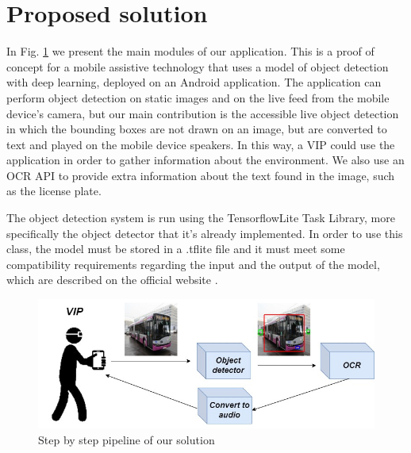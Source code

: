\section{Proposed solution} \label{deployment}

    In Fig. \ref{pipeline} we present the main modules of our application. This is a proof of concept for a mobile assistive technology that uses a model of object detection with deep learning, deployed on an Android application. The application can perform object detection on static images and on the live feed from the mobile device's camera, but our main contribution is the accessible live object detection in which the bounding boxes are not drawn on an image, but are converted to text and played on the mobile device speakers. In this way, a VIP could use the application in order to gather information about the environment. We also use an OCR API to provide extra information about the text found in the image, such as the license plate.

    The object detection system is run using the TensorflowLite Task Library, more specifically the object detector that it's already implemented. In order to use this class, the model must be stored in a .tflite file and it must meet some compatibility requirements regarding the input and the output of the model, which are described on the official website \cite{tf_compat}.
    
    
       \begin{figure}[!t]
      \centering
      \includegraphics[scale=0.3]{images/pipelinev2.jpg}
      \caption{Step by step pipeline of our solution}
      \label{pipeline}
    \end{figure} 